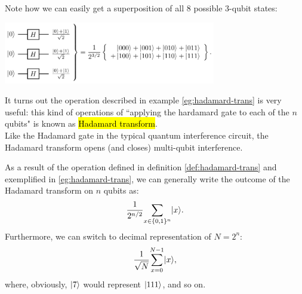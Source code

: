 \documentclass[12pt]{article}
\begin{document}
\begin{example}\label{eg:hadamard-trans}
Note how we can easily get a superposition of all $8$ possible $3$-qubit states:
\begin{center}
    \includegraphics[width = 25em]{images/1.jpg}
\end{center}
\end{example}

\begin{definition}\label{def:hadamard-trans}
It turns out the operation described in example \ref{eg:hadamard-trans} is very useful: this kind of operations of ``applying the hardamard gate to each of the $n$ qubits" is known as \hl{Hadamard transform}.\\

\noindent Like the Hadamard gate in the typical quantum interference circuit, the Hadamard transform opens (and closes) multi-qubit interference.
\end{definition}

\begin{notation}
As a result of the operation defined in definition \ref{def:hadamard-trans} and exemplified in \ref{eg:hadamard-trans}, we can generally write the outcome of the Hadamard transform on $n$ qubits as: $$
\frac{1}{2^{n/2}}\underset{x\in \{0,1\}^n}{\sum}\Ket{x}.
$$ Furthermore, we can switch to decimal representation of $N = 2^n$: $$
\frac{1}{\sqrt{N}} \Sum{x}{0}{N-1}\Ket{x},
$$ where, obviously, $\Ket{7}$ would represent $\Ket{111}$, and so on.
\end{notation}
\end{document}

